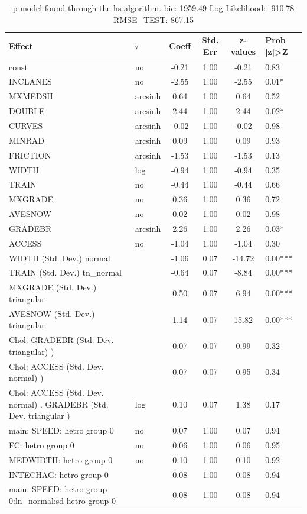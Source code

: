 \begin{table}
	\caption{p model found through the hs algorithm. bic: 1959.49 Log-Likelihood: -910.78 RMSE_TEST: 867.15}
	\begin{center}
		\begin{tabular}{|l|l|c|c|c|l|}
			\hline
			Effect & $\tau$ & Coeff & Std. Err & z-values & Prob |z|>Z \\
			\hline
			const & no & -0.21 & 1.00 & -0.21 & 0.83 \\
			\hline
			INCLANES & no & -2.55 & 1.00 & -2.55 & 0.01* \\
			\hline
			MXMEDSH & arcsinh & 0.64 & 1.00 & 0.64 & 0.52 \\
			\hline
			DOUBLE & arcsinh & 2.44 & 1.00 & 2.44 & 0.02* \\
			\hline
			CURVES & arcsinh & -0.02 & 1.00 & -0.02 & 0.98 \\
			\hline
			MINRAD & arcsinh & 0.09 & 1.00 & 0.09 & 0.93 \\
			\hline
			FRICTION & arcsinh & -1.53 & 1.00 & -1.53 & 0.13 \\
			\hline
			WIDTH & log & -0.94 & 1.00 & -0.94 & 0.35 \\
			\hline
			TRAIN & no & -0.44 & 1.00 & -0.44 & 0.66 \\
			\hline
			MXGRADE & no & 0.36 & 1.00 & 0.36 & 0.72 \\
			\hline
			AVESNOW & no & 0.02 & 1.00 & 0.02 & 0.98 \\
			\hline
			GRADEBR & arcsinh & 2.26 & 1.00 & 2.26 & 0.03* \\
			\hline
			ACCESS & no & -1.04 & 1.00 & -1.04 & 0.30 \\
			\hline
			WIDTH (Std. Dev.) normal &  & -1.06 & 0.07 & -14.72 & 0.00*** \\
			\hline
			TRAIN (Std. Dev.) tn_normal &  & -0.64 & 0.07 & -8.84 & 0.00*** \\
			\hline
			MXGRADE (Std. Dev.) triangular &  & 0.50 & 0.07 & 6.94 & 0.00*** \\
			\hline
			AVESNOW (Std. Dev.) triangular &  & 1.14 & 0.07 & 15.82 & 0.00*** \\
			\hline
			 Chol: GRADEBR (Std. Dev. triangular) ) &  & 0.07 & 0.07 & 0.99 & 0.32 \\
			\hline
			 Chol: ACCESS (Std. Dev. normal) ) &  & 0.07 & 0.07 & 0.95 & 0.34 \\
			\hline
			 Chol: ACCESS (Std. Dev. normal) . GRADEBR (Std. Dev.   triangular ) & log & 0.10 & 0.07 & 1.38 & 0.17 \\
			\hline
			main: SPEED: hetro group 0 & no & 0.07 & 1.00 & 0.07 & 0.94 \\
			\hline
			FC: hetro group 0 & no & 0.06 & 1.00 & 0.06 & 0.95 \\
			\hline
			MEDWIDTH: hetro group 0 & no & 0.10 & 1.00 & 0.10 & 0.92 \\
			\hline
			INTECHAG: hetro group 0 &  & 0.08 & 1.00 & 0.08 & 0.94 \\
			\hline
			main: SPEED: hetro group 0:ln_normal:sd  hetro group 0 &  & 0.08 & 1.00 & 0.08 & 0.94 \\
			\hline
		\end{tabular}
	\end{center}
\end{table}